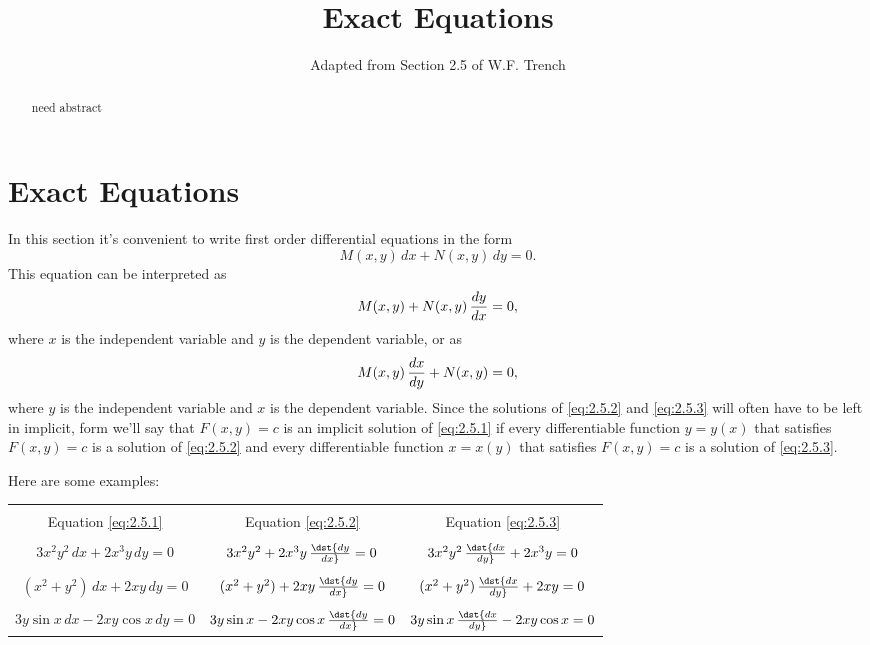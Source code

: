 \documentclass{ximera}
\title{Exact Equations}
\author{Adapted from Section 2.5 of W.F. Trench}
\begin{document}
\label{Module 0}

\begin{abstract}
need abstract
\end{abstract}

\maketitle

\section*{Exact Equations}

In this  section it's convenient to write first order
differential equations in the form
\begin{equation} \label{eq:2.5.1}
M(x,y)\,dx+N(x,y)\,dy=0.
\end{equation}
This equation  can be interpreted as
\begin{equation} \label{eq:2.5.2}
M(x,y)+N(x,y)\,{dy\over dx}=0,
\end{equation}
where $x$ is the independent variable and $y$ is the dependent
variable, or as
\begin{equation} \label{eq:2.5.3}
M(x,y)\,{dx\over dy}+N(x,y)=0,
\end{equation}
where $y$ is the independent variable and $x$ is the dependent
variable. Since the solutions of \eqref{eq:2.5.2} and \eqref{eq:2.5.3} will
often have to be left in
implicit, form we'll say that $F(x,y)=c$ is an implicit solution of
\eqref{eq:2.5.1} if every differentiable function $y=y(x)$ that satisfies
$F(x,y)=c$ is a solution of \eqref{eq:2.5.2} and every
differentiable function $x=x(y)$ that satisfies $F(x,y)=c$ is a
solution of \eqref{eq:2.5.3}.

Here are  some examples:

\begin{center}\label{table:2.5.1}\vspace*{6pt}

\begin{tabular}{|c|c|c|} \hline
& & \\[-6pt]
Equation \eqref{eq:2.5.1}&Equation \eqref{eq:2.5.2}&Equation \eqref{eq:2.5.3}
\\[9pt]\hline & & \\[-6pt]
$3x^2y^2\,dx+2x^3y\,dy =0$ &$3x^2y^2+2x^3y\,\dst{dy\over
dx} =0$  &$3x^2y^2\,\dst{dx\over dy}+2x^3y=0$
\\[9pt]\hline
& & \\[-6pt]
$(x^2+y^2)\,dx +2xy\,dy=0$ &
$(x^2+y^2)+2xy\,\dst{dy\over dx}=0$&
$(x^2+y^2)\,\dst{dx\over dy} +2xy=0$
\\[9pt]\hline
& & \\[-6pt]
$3y\sin x\,dx-2xy\cos x\,dy =0$
&$3y\sin x-2xy\cos x\,\dst{dy\over dx} =0$
& $3y\sin x\,\dst{dx\over dy}-2xy\cos x  =0$
\\[9pt]\hline
\end{tabular}
\end{center}
\end{document}
